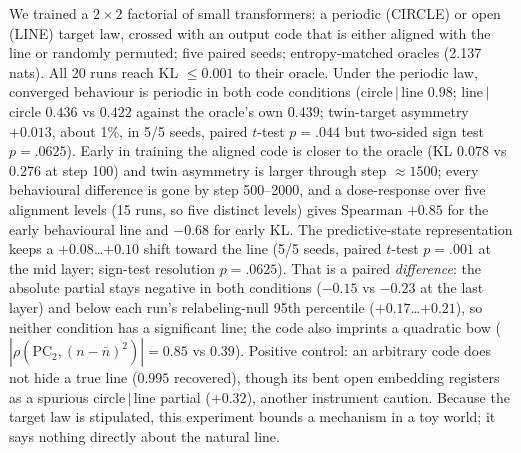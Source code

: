 \documentclass[11pt]{article}
\newcommand{\lc}{line$\,|\,$circle}
\newcommand{\cl}{circle$\,|\,$line}
\begin{document}
\begin{resultbox}
We trained a $2\times2$ factorial of small transformers: a periodic (CIRCLE) or open (LINE) target law, crossed with an output code that is either aligned with the line or randomly permuted; five paired seeds; entropy-matched oracles (2.137 nats). All 20 runs reach KL $\le0.001$ to their oracle. Under the periodic law, converged behaviour is periodic in both code conditions (\cl{} $0.98$; \lc{} $0.436$ vs $0.422$ against the oracle's own $0.439$; twin-target asymmetry $+0.013$, about 1\%, in 5/5 seeds, paired $t$-test $p=.044$ but two-sided sign test $p=.0625$). Early in training the aligned code is closer to the oracle (KL $0.078$ vs $0.276$ at step 100) and twin asymmetry is larger through step $\approx1500$; every behavioural difference is gone by step 500--2000, and a dose-response over five alignment levels (15 runs, so five distinct levels) gives Spearman $+0.85$ for the early behavioural line and $-0.68$ for early KL. The predictive-state representation keeps a $+0.08$…$+0.10$ shift toward the line (5/5 seeds, paired $t$-test $p=.001$ at the mid layer; sign-test resolution $p=.0625$). That is a paired \emph{difference}: the absolute partial stays negative in both conditions ($-0.15$ vs $-0.23$ at the last layer) and below each run's relabeling-null 95th percentile ($+0.17$…$+0.21$), so neither condition has a significant line; the code also imprints a quadratic bow ($|\rho(\mathrm{PC}_2,(n-\bar n)^2)|=0.85$ vs $0.39$). Positive control: an arbitrary code does not hide a true line ($0.995$ recovered), though its bent open embedding registers as a spurious \cl{} partial ($+0.32$), another instrument caution. Because the target law is stipulated, this experiment bounds a mechanism in a toy world; it says nothing directly about the natural line.
\end{resultbox}
\end{document}
